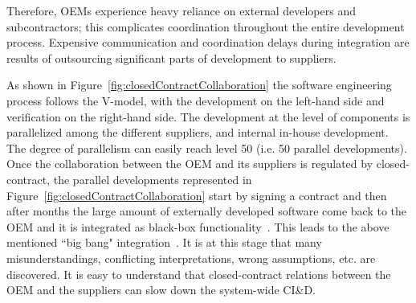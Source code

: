 Therefore, OEMs experience heavy reliance on external developers and subcontractors; this complicates coordination throughout the entire development process. Expensive communication and coordination delays during integration are results of outsourcing significant parts of development to suppliers. %

As shown in Figure~\ref{fig:closedContractCollaboration} the software engineering process follows the V-model, with the development on the left-hand side and verification on the right-hand side. The development at the level of components is parallelized among the different suppliers, and internal in-house development. The degree of parallelism can easily reach level 50 (i.e. 50 parallel developments). Once the collaboration between the OEM and its suppliers is regulated by closed-contract, the parallel developments represented in Figure~\ref{fig:closedContractCollaboration} start by signing a contract and then after months the large amount of externally developed software come back to the OEM and it is integrated as black-box functionality~\cite{Patrizio2016AAF_Chalmers,Broy2009AAF_TUM,Broy:2006:CAS:1134285.1134292}. 
This leads to the above mentioned ``big bang" integration~\cite{Eklund2012}. %
It is at this stage that many misunderstandings, conflicting interpretations, wrong assumptions, etc. are discovered.
It is easy to understand that closed-contract relations between the OEM and the suppliers can slow down the system-wide CI\&D.  %

